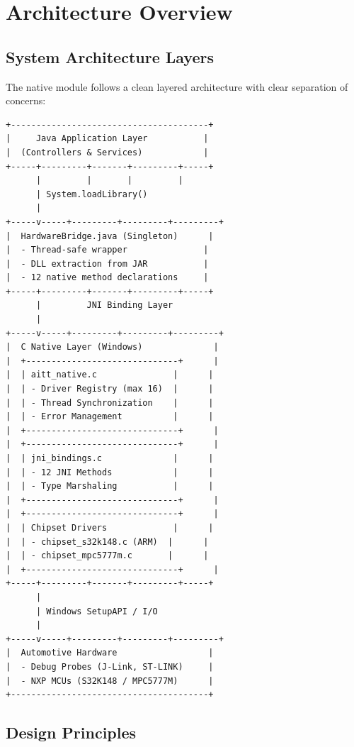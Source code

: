 \documentclass[12pt,a4paper]{article}
\begin{document}
\newpage

\section{Architecture Overview}

\subsection{System Architecture Layers}

The native module follows a clean layered architecture with clear separation of concerns:

\begin{verbatim}
+---------------------------------------+
|     Java Application Layer           |
|  (Controllers & Services)            |
+-----+---------+-------+---------+-----+
      |         |       |         |
      | System.loadLibrary()
      |
+-----v-----+---------+---------+---------+
|  HardwareBridge.java (Singleton)      |
|  - Thread-safe wrapper               |
|  - DLL extraction from JAR           |
|  - 12 native method declarations     |
+-----+---------+-------+---------+-----+
      |         JNI Binding Layer
      |
+-----v-----+---------+---------+---------+
|  C Native Layer (Windows)              |
|  +------------------------------+      |
|  | aitt_native.c               |      |
|  | - Driver Registry (max 16)  |      |
|  | - Thread Synchronization    |      |
|  | - Error Management          |      |
|  +------------------------------+      |
|  +------------------------------+      |
|  | jni_bindings.c              |      |
|  | - 12 JNI Methods            |      |
|  | - Type Marshaling           |      |
|  +------------------------------+      |
|  +------------------------------+      |
|  | Chipset Drivers             |      |
|  | - chipset_s32k148.c (ARM)  |      |
|  | - chipset_mpc5777m.c       |      |
|  +------------------------------+      |
+-----+---------+-------+---------+-----+
      |
      | Windows SetupAPI / I/O
      |
+-----v-----+---------+---------+---------+
|  Automotive Hardware                  |
|  - Debug Probes (J-Link, ST-LINK)     |
|  - NXP MCUs (S32K148 / MPC5777M)      |
+---------------------------------------+
\end{verbatim}

\subsection{Design Principles}
\end{document}
